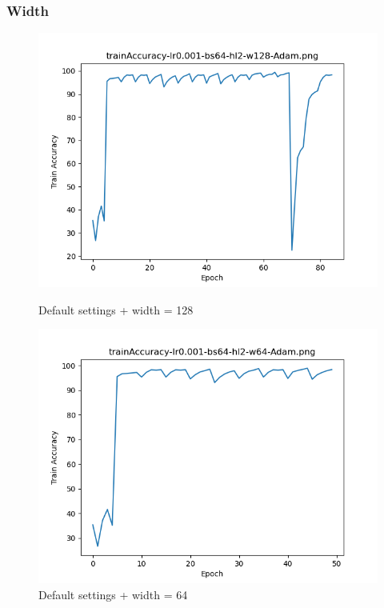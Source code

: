 \documentclass{article}[12pt]
\begin{document}
\subsubsection{Width}

    \begin{figure}[H]
        \includegraphics[width=\linewidth]{testsResults/trainAccuracy/def.png}
        \caption{Default settings + width = 128}
        \endminipage\hfill
        \includegraphics[width=\linewidth]{testsResults/trainAccuracy/trainAccuracy-lr0.001-bs64-hl2-w64-Adam.png}
        \caption{Default settings + width = 64}
        \endminipage
    \end{figure}
\end{document}

